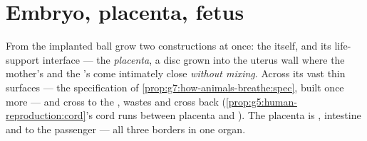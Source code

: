 \section{Embryo, placenta, fetus}

\begin{definition}\label{def:g8:from-egg-to-birth:placenta}
From the implanted ball grow two constructions at once:
the \emph{} itself, and its life-support interface
--- the \emph{placenta}, a disc grown
into the uterus wall where the mother's  and the
's  come intimately close \emph{without
mixing}. Across its vast thin surfaces --- the
specification of \cref{prop:g7:how-animals-breathe:spec},
built once more ---  and  cross to the
, wastes and  cross back
(\cref{prop:g5:human-reproduction:cord}'s cord runs
between placenta and ). The placenta is ,
intestine and  to the passenger --- all three
borders in one organ.
\end{definition}

